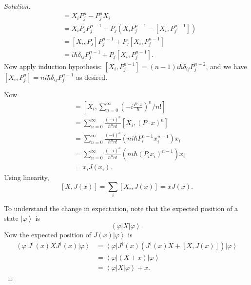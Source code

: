 \begin{proof}[Solution]
	\begin{align*}
		[X_i, P_j^n]
		&= X_i P_j^n - P_j^n X_i \\
		&= X_i P_j P_j^{n-1} - P_j \left( X_i P_j^{n-1} - [X_i, P_j^{n-1}] \right)  \\
		&= [X_i, P_j] P_j^{n-1} + P_j [X_i, P_j^{n-1}] \\
		&= i \hbar \delta_{ij} P_{j}^{n-1} + P_j [X_i, P_j^{n-1}]
	.\end{align*}
	Now apply induction hypothesis:  $[X_i, P_j^{n-1}] = (n-1) i \hbar \delta_{ij} P_j^{n-2}$, and we have $\left[X_i, P_j^n\right]=n i \hbar \delta_{i j} P_j^{n-1}$ as desired.
	
	Now
	\begin{align*}
		[X_i, J(x)]
		&= \left[X_i, \sum_{n = 0}^{\infty } \left( - i \frac{P \cdot x}{\hbar} \right)^n / n!  \right]  \\
		&= \sum_{n = 0}^{\infty } \frac{(- i)^n}{\hbar^n n!}  [X_i, (P \cdot x)^n] \\
		&= \sum_{n = 0}^{\infty } \frac{(- i)^n}{\hbar^n n!}  (n i \hbar P_i^{n-1} x_i^{n-1}) x_i\\
		&= \sum_{n = 0}^{\infty } \frac{(- i)^n}{\hbar^n n!}  (n i \hbar (P_i x_i)^{n-1}) x_i\\
		&= x_i J(x_i)
	.\end{align*}
	Using linearity, 
	\[
		[X, J(x)] = \sum_{i} [X_i, J(x)] = x J(x)
	.\] 

To understand the change in expectation, note that the expected position of a state $\left| \varphi \right\rangle $ is
\[
	\left\langle \varphi \right| X \left| \varphi \right\rangle 
.\] 
Now the expected position of $J(x) \left| \varphi \right\rangle $ is
\begin{align*}
	\left\langle \varphi \right| J^{\dag} (x) X J^{\dag} (x) \left| \varphi \right\rangle 
	&= \left\langle \varphi \right| J^{\dag} (x) \left( J^{\dag} (x) X + [X, J(x)] \right)  \left| \varphi \right\rangle \\
	&= \left\langle \varphi \right| (X + x)  \left| \varphi \right\rangle \\
	&= \left\langle \varphi \right| X \left| \varphi \right\rangle  + x 
.\end{align*} 
\end{proof}

